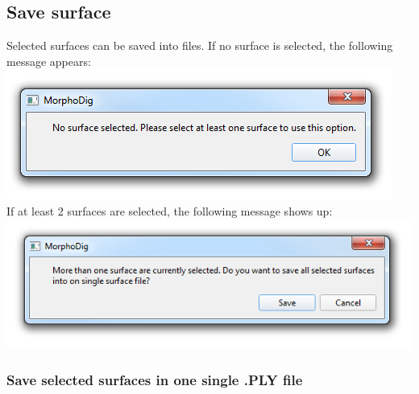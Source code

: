 \subsection{Save surface}
Selected surfaces can be saved into files. If no surface is selected, the following message appears:\\
\includegraphics[scale=0.5]{images/07/surface/no_surface_selected.png}\\
If at least 2 surfaces are selected, the following message shows up:\\
\includegraphics[scale=0.5]{images/07/surface/at_least_2_surfaces_selected.png}

\subsubsection{Save selected surfaces in one single .PLY file}


